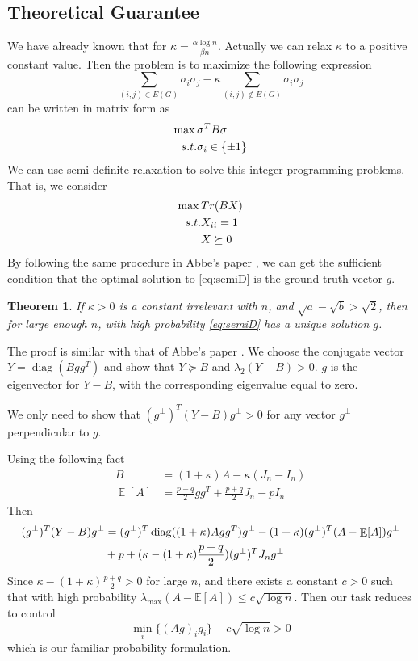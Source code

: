 \documentclass{ctexart}
\newtheorem{theorem}{Theorem}
\DeclareMathOperator{\diag}{diag}
\DeclareMathOperator{\E}{\mathbb{E}}
\begin{document}
\subsection{Theoretical Guarantee}
We have already known that for $\kappa = \frac{\alpha \log n}{\beta n}$.
Actually we can relax $\kappa$ to a positive constant value.
Then the problem is to maximize
the following expression
\begin{equation}
\sum_{(i,j)\in E(G)} \sigma_i \sigma_j - \kappa \sum_{(i,j) \not\in E(G)} \sigma_i \sigma_j
\end{equation}
can be written in matrix form
as 
\begin{align}
\max \, & \sigma^T B \sigma \label{eq:sigmaB}\\
s.t. & \sigma_i \in \{\pm 1\} \notag
\end{align}
We can use semi-definite relaxation to solve this integer programming problems.
That is, we consider
\begin{align}
\max \,& Tr(BX) \label{eq:semiD}\\
s.t. & X_{ii} = 1 \notag \\
&  X \succeq 0 \notag
\end{align}
By following the same procedure in Abbe's paper \cite{abbe2015exact}, we can get the sufficient condition that the optimal solution
to \eqref{eq:semiD} is the ground truth vector $g$.
\begin{theorem}
If $\kappa > 0$ is a constant irrelevant with $n$, and $\sqrt{a} - \sqrt{b} > \sqrt{2}$, then for large enough $n$,
with high probability \eqref{eq:semiD} has a unique solution $g$.
\end{theorem}
The proof is similar with that of Abbe's paper \cite{abbe2015exact}.
We choose the conjugate vector $Y=\diag(Bgg^T)$ and show that 
 $Y \succeq B$ and $\lambda_2(Y-B)>0$.
$g$ is the eigenvector for $Y-B$, with the corresponding eigenvalue equal to zero.

We only need to show that $(g^{\perp})^T (Y-B)g^{\perp} >0$
for any vector $g^{\perp}$ perpendicular to $g$.

Using the following fact
\begin{align}
B &= (1+\kappa) A - \kappa(J_n - I_n) \\
\E[A] &= \frac{p-q}{2}gg^T + \frac{p+q}{2}J_n - pI_n
\end{align}
Then
\begin{align}
	(g^{\perp})^T(Y-B)g^{\perp} &= 
	(g^{\perp})^T\diag((1+\kappa)Agg^T) g^{\perp} 
	-(1+\kappa)(g^{\perp})^T(A-\E[A])g^{\perp}\notag\\
	&+p +(\kappa -(1+\kappa)\frac{p+q}{2})(g^{\perp})^TJ_ng^{\perp}
\end{align}
Since $\kappa -(1+\kappa)\frac{p+q}{2}>0$ for large $n$,
and there exists a constant $c>0$ such that with high
probability $\lambda_{\max}(A-\mathbb{E}[A]) \leq c\sqrt{\log n}$.
Then our task reduces to control
\begin{equation*}
	\min_{i} \{(Ag)_i g_i\} - c \sqrt{\log n} > 0
\end{equation*}
which is our familiar probability formulation.
\end{document}
